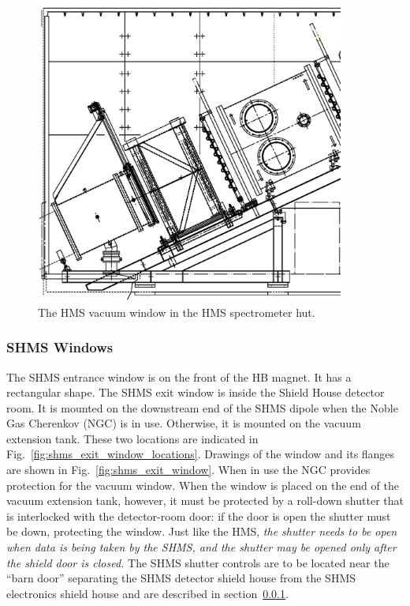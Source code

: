 \begin{figure}
\begin{center}
\includegraphics[width=4in]{figHMShut}
\caption{The HMS vacuum window in the HMS spectrometer hut.
\label{fig:hms_window2}}
\end{center}
\end{figure}

\subsubsection{SHMS Windows}
\label{sec:shmswindows}
The SHMS entrance window is on the front of the HB magnet. It has a rectangular shape.
The SHMS exit window is inside the Shield House detector room. It is mounted on the
downstream end of the SHMS dipole when the Noble Gas Cherenkov (NGC)
is in use. Otherwise, it is mounted on the vacuum extension tank.  These two locations
are indicated in Fig.~\ref{fig:shms_exit_window_locations}.  Drawings of
the window and its flanges are shown in Fig.~\ref{fig:shms_exit_window}. When in use
the NGC provides protection for the vacuum window. When the window is placed on
the end of the vacuum extension tank, however, it must be protected by a roll-down
shutter that is interlocked with the detector-room door: if the door is open the shutter
must be down, protecting the window. Just like the HMS, \emph{the shutter needs to be
open when data is being taken by the SHMS, and the shutter may be opened only
after the shield door is closed.} The SHMS shutter controls are to be located near
the ``barn door'' separating the SHMS detector shield house from the SHMS electronics
shield house and are described in section~\ref{sec:shmswindows}.

